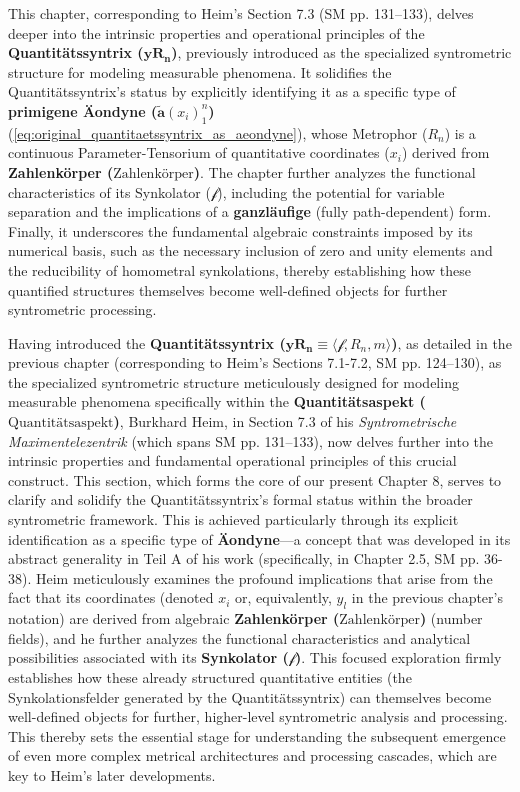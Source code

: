 \documentclass[12pt]{article}
\newcommand{\synkolationsstufe}{m}
\newcommand{\quantitaetsaspekt}{\text{Quantitätsaspekt}}
\newcommand{\quantitaetssyntrix}{\bm{yR_n}}
\newcommand{\zahlenkoerper}{\text{Zahlenkörper}}
\newcommand{\semantischermetrophor}{R_n}
\newcommand{\funktionaloperator}{\mathcal{f}}
\newcommand{\aeondynechaptereight}{\mathbf{\widetilde{a}}(x_i)^n_1}
\begin{document}
This chapter, corresponding to Heim's Section 7.3 (SM pp. 131–133), delves deeper into the intrinsic properties and operational principles of the \textbf{Quantitätssyntrix (\(\quantitaetssyntrix\))}, previously introduced as the specialized syntrometric structure for modeling measurable phenomena. It solidifies the Quantitätssyntrix's status by explicitly identifying it as a specific type of \textbf{primigene Äondyne (\(\aeondynechaptereight\))} (\eqref{eq:original_quantitaetssyntrix_as_aeondyne}), whose Metrophor (\(R_n\)) is a continuous Parameter-Tensorium of quantitative coordinates (\(x_i\)) derived from \textbf{Zahlenkörper (\(\zahlenkoerper\))}. The chapter further analyzes the functional characteristics of its Synkolator (\(\funktionaloperator\)), including the potential for variable separation and the implications of a \textbf{ganzläufige} (fully path-dependent) form. Finally, it underscores the fundamental algebraic constraints imposed by its numerical basis, such as the necessary inclusion of zero and unity elements and the reducibility of homometral synkolations, thereby establishing how these quantified structures themselves become well-defined objects for further syntrometric processing.

Having introduced the \textbf{Quantitätssyntrix (\( \quantitaetssyntrix \equiv \langle \funktionaloperator, \semantischermetrophor, \synkolationsstufe \rangle \))}, as detailed in the previous chapter (corresponding to Heim's Sections 7.1-7.2, SM pp. 124–130), as the specialized syntrometric structure meticulously designed for modeling measurable phenomena specifically within the \textbf{Quantitätsaspekt (\(\quantitaetsaspekt\))}, Burkhard Heim, in Section 7.3 of his \textit{Syntrometrische Maximentelezentrik} (which spans SM pp. 131–133), now delves further into the intrinsic properties and fundamental operational principles of this crucial construct. This section, which forms the core of our present Chapter 8, serves to clarify and solidify the Quantitätssyntrix's formal status within the broader syntrometric framework. This is achieved particularly through its explicit identification as a specific type of \textbf{Äondyne}—a concept that was developed in its abstract generality in Teil A of his work (specifically, in Chapter 2.5, SM pp. 36-38). Heim meticulously examines the profound implications that arise from the fact that its coordinates (denoted \( x_i \) or, equivalently, \( y_l \) in the previous chapter's notation) are derived from algebraic \textbf{Zahlenkörper (\(\zahlenkoerper\))} (number fields), and he further analyzes the functional characteristics and analytical possibilities associated with its \textbf{Synkolator (\(\funktionaloperator\))}. This focused exploration firmly establishes how these already structured quantitative entities (the Synkolationsfelder generated by the Quantitätssyntrix) can themselves become well-defined objects for further, higher-level syntrometric analysis and processing. This thereby sets the essential stage for understanding the subsequent emergence of even more complex metrical architectures and processing cascades, which are key to Heim's later developments.
\end{document}
